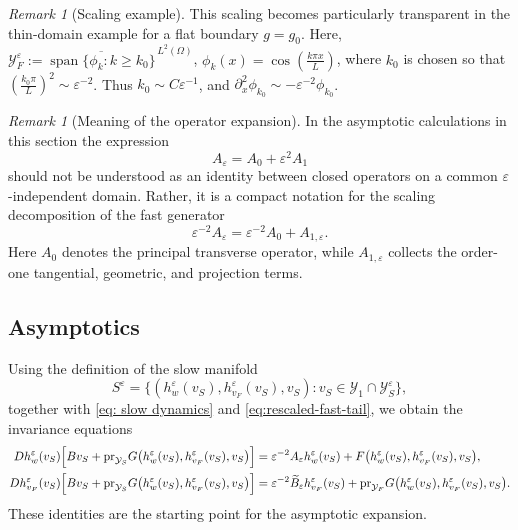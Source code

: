 \documentclass[11pt]{article}
\theoremstyle{definition}
\theoremstyle{remark}
\newtheorem{remark}[theorem]{Remark}
\numberwithin{equation}{section}
\newcommand{\mc}[1]{\mathcal{#1}}
\newcommand{\pr}{\textnormal{pr}}
\begin{document}
\begin{remark}[Scaling example]
    This scaling becomes particularly transparent in the thin-domain example for a flat boundary $g=g_0$.
Here, \(\mc Y_F^\varepsilon := \overline{\operatorname{span}\{\phi_k:k\ge k_0\}}^{\,L^2(\Omega)}\), \(\phi_k(x)=\cos\!\left(\frac{k\pi x}{L}\right) \), where \(k_0\) is chosen so that \(\left(\frac{k_0\pi}{L}\right)^2\sim \varepsilon^{-2}\). Thus \(k_0\sim C\varepsilon^{-1}\), and \(\partial_x^2\phi_{k_0}\sim -\varepsilon^{-2}\phi_{k_0}\).
\end{remark}

\begin{remark}[Meaning of the operator expansion]
\label{rem:formal-operator-expansion}
In the asymptotic calculations in this section the expression
\[
A_\varepsilon=A_0+\varepsilon^2A_1
\]
should not be understood as an identity between closed operators on a common \(\varepsilon\)-independent domain. 
Rather, it is a compact notation for the scaling decomposition of the fast generator
\[
\varepsilon^{-2}A_\varepsilon
=
\varepsilon^{-2}A_0+ A_{1,\varepsilon}.
\]
Here \(A_0\) denotes the principal transverse operator, while \(A_{1,\varepsilon}\) collects the order-one tangential, geometric, and projection terms. 

\end{remark}


\subsection{Asymptotics}

Using the definition of the slow manifold
\[
S^\varepsilon
=
\{
(h_w^\varepsilon(v_S),h_{v_F}^\varepsilon(v_S),v_S):
v_S\in \mc Y_1\cap \mc Y_S^\varepsilon
\},
\]
together with \eqref{eq: slow dynamics} and
\eqref{eq:rescaled-fast-tail}, we obtain the invariance equations
\begin{align}
\label{eq:invar-w-corrected}
Dh_w^\varepsilon(v_S)
\Big[
Bv_S
+
\pr_{\mc Y_S}G\bigl(
h_w^\varepsilon(v_S),
h_{v_F}^\varepsilon(v_S),
v_S
\bigr)
\Big]
&=
\varepsilon^{-2}A_\varepsilon h_w^\varepsilon(v_S)
+
F\bigl(
h_w^\varepsilon(v_S),
h_{v_F}^\varepsilon(v_S),
v_S
\bigr),
\\
\label{eq:invar-vF-corrected}
Dh_{v_F}^\varepsilon(v_S)
\Big[
Bv_S
+
\pr_{\mc Y_S}G\bigl(
h_w^\varepsilon(v_S),
h_{v_F}^\varepsilon(v_S),
v_S
\bigr)
\Big]
&=
\varepsilon^{-2}\widetilde B_\varepsilon h_{v_F}^\varepsilon(v_S)
+
\pr_{\mc Y_F}G\bigl(
h_w^\varepsilon(v_S),
h_{v_F}^\varepsilon(v_S),
v_S
\bigr).
\end{align}
These identities are the starting point for the asymptotic expansion.
\end{document}
